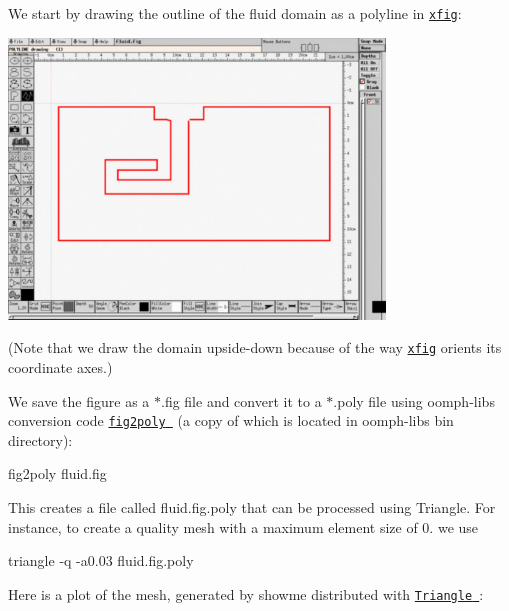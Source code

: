 We start by drawing the outline of the fluid domain as a polyline in \href{http://en.wikipedia.org/wiki/Xfig}{\tt xfig}\+:

 
\begin{DoxyImage}
\includegraphics[width=0.75\textwidth]{xfig_screenshot}
\end{DoxyImage}


(Note that we draw the domain upside-\/down because of the way \href{http://en.wikipedia.org/wiki/Xfig}{\tt xfig} orients its coordinate axes.)

We save the figure as a $\ast$.fig file and convert it to a $\ast$.poly file using {\ttfamily oomph-\/lib\textquotesingle{}s} conversion code \href{../../../meshes/mesh_from_xfig/html/index.html}{\tt {\ttfamily fig2poly} } (a copy of which is located in {\ttfamily oomph-\/lib\textquotesingle{}s} {\ttfamily bin} directory)\+:


\begin{DoxyCode}
fig2poly fluid.fig 
\end{DoxyCode}


This creates a file called {\ttfamily fluid.\+fig.\+poly} that can be processed using Triangle. For instance, to create a quality mesh with a maximum element size of 0. we use 
\begin{DoxyCode}
triangle -q -a0.03 fluid.fig.poly
\end{DoxyCode}


Here is a plot of the mesh, generated by {\ttfamily showme} distributed with \href{http://www.cs.cmu.edu/~quake/triangle.html}{\tt {\ttfamily Triangle} }\+:

